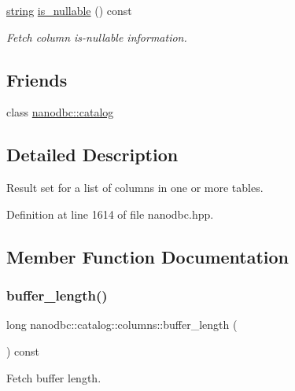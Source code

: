 \begin{DoxyCompactItemize}
\mbox{\hyperlink{namespacenanodbc_abfc0ece56278e590911ec8352774c212}{string}} \mbox{\hyperlink{classnanodbc_1_1catalog_1_1columns_aec69eacef15e7eae155f3267ebad1a78}{is\+\_\+nullable}} () const
\begin{DoxyCompactList}\small\item\em Fetch column is-\/nullable information. \end{DoxyCompactList}\end{DoxyCompactItemize}
\subsection*{Friends}
\begin{DoxyCompactItemize}
\item 
class \mbox{\hyperlink{classnanodbc_1_1catalog_1_1columns_af0f3134c7f6f1f36bfe1e247318dfe43}{nanodbc\+::catalog}}
\end{DoxyCompactItemize}


\subsection{Detailed Description}
Result set for a list of columns in one or more tables. 

Definition at line 1614 of file nanodbc.\+hpp.



\subsection{Member Function Documentation}
\mbox{\label{classnanodbc_1_1catalog_1_1columns_af1616d5e1f9616bf72e3881e068fd435}} 
\subsubsection{\texorpdfstring{buffer\_length()}{buffer\_length()}}
{\footnotesize\ttfamily long nanodbc\+::catalog\+::columns\+::buffer\+\_\+length (\begin{DoxyParamCaption}{ }\end{DoxyParamCaption}) const}



Fetch buffer length. 



